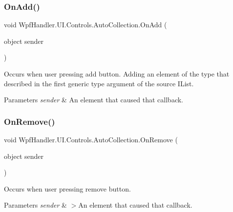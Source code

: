\subsubsection{\texorpdfstring{On\+Add()}{OnAdd()}}
{\footnotesize\ttfamily void Wpf\+Handler.\+U\+I.\+Controls.\+Auto\+Collection.\+On\+Add (\begin{DoxyParamCaption}\item[{object}]{sender }\end{DoxyParamCaption})\hspace{0.3cm}{\ttfamily [protected]}}



Occurs when user pressing add button. Adding an element of the type that described in the first generic type argument of the source I\+List. 


\begin{DoxyParams}{Parameters}
{\em sender} & An element that caused that callback.\\
\hline
\end{DoxyParams}
\mbox{\label{class_wpf_handler_1_1_u_i_1_1_controls_1_1_auto_collection_addd4df92578229539c28bc4db8121d68}} 
\subsubsection{\texorpdfstring{On\+Remove()}{OnRemove()}}
{\footnotesize\ttfamily void Wpf\+Handler.\+U\+I.\+Controls.\+Auto\+Collection.\+On\+Remove (\begin{DoxyParamCaption}\item[{object}]{sender }\end{DoxyParamCaption})\hspace{0.3cm}{\ttfamily [protected]}}



Occurs when user pressing remove button. 


\begin{DoxyParams}{Parameters}
{\em sender} & $>$An element that caused that callback.\\
\hline
\end{DoxyParams}
\mbox{\label{class_wpf_handler_1_1_u_i_1_1_controls_1_1_auto_collection_a01ab069c42e1737cebb4bb813ec8aa06}} 

